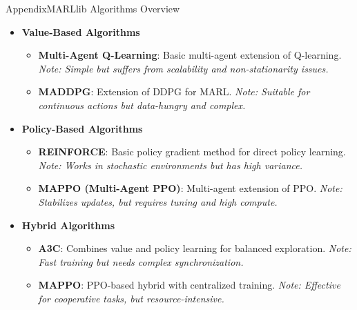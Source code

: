 \begin{frame}[allowframebreaks]{Appendix}{MARLlib Algorithms Overview}

    \begin{itemize}
        \item \textbf{Value-Based Algorithms}
              \begin{itemize}
                  \item \textbf{Multi-Agent Q-Learning}: Basic multi-agent extension of Q-learning.\newline
                  \textit{Note: Simple but suffers from scalability and non-stationarity issues.}
                  \item \textbf{MADDPG}: Extension of DDPG for MARL.\newline
                  \textit{Note: Suitable for continuous actions but data-hungry and complex.}
              \end{itemize}

        \item \textbf{Policy-Based Algorithms}
              \begin{itemize}
                  \item \textbf{REINFORCE}: Basic policy gradient method for direct policy learning.\newline
                  \textit{Note: Works in stochastic environments but has high variance.}
                  \item \textbf{MAPPO (Multi-Agent PPO)}: Multi-agent extension of PPO.\newline
                  \textit{Note: Stabilizes updates, but requires tuning and high compute.}
              \end{itemize}

        \item \textbf{Hybrid Algorithms}
              \begin{itemize}
                  \item \textbf{A3C}: Combines value and policy learning for balanced exploration.\newline
                  \textit{Note: Fast training but needs complex synchronization.}
                  \item \textbf{MAPPO}: PPO-based hybrid with centralized training.\newline
                  \textit{Note: Effective for cooperative tasks, but resource-intensive.}
              \end{itemize}


\end{itemize}
\end{frame}
